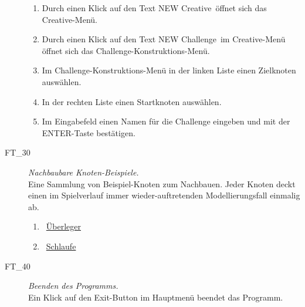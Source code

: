 \begin{description}
\begin{enumerate}
		\item Durch einen Klick auf den Text \glqq NEW Creative\grqq~öffnet sich das Creative-Menü.
		\item Durch einen Klick auf den Text \glqq NEW Challenge\grqq~im Creative-Menü öffnet sich das Challenge-Konstruktions-Menü.
		\item Im Challenge-Konstruktions-Menü in der linken Liste einen Zielknoten auswählen.
		\item In der rechten Liste einen Startknoten auswählen.
		\item Im Eingabefeld einen Namen für die Challenge eingeben und mit der \glqq ENTER\grqq-Taste bestätigen.
		~\\
		
	\end{enumerate}


	
\label{FT:30}
	
	\item[FT\_30] \textit{Nachbaubare Knoten-Beispiele.} \hfill\\
	
	Eine Sammlung von Beispiel-Knoten zum Nachbauen. Jeder Knoten deckt einen im Spielverlauf immer wieder-auftretenden Modellierungsfall einmalig ab. 
	
	\begin{enumerate}
	
		\label{FT:30:Ueberleger}
		\item \mousecursor~\hyperref[Abb:Test-Knoten:Ueberleger]{\glqq Überleger\grqq}
		
		\label{FT:30:Schlaufe}
		\item \mousecursor~\hyperref[Abb:Test-Knoten:Schlaufe]{\glqq Schlaufe\grqq}
		~\\

	\end{enumerate}


	
\label{FT:40}
	
	\item[FT\_40] \textit{Beenden des Programms.} \hfill\\
	
	Ein Klick auf den \glqq Exit\grqq-Button im Hauptmenü beendet das Programm.
	~\\



\label{FT:50}


\end{description}

